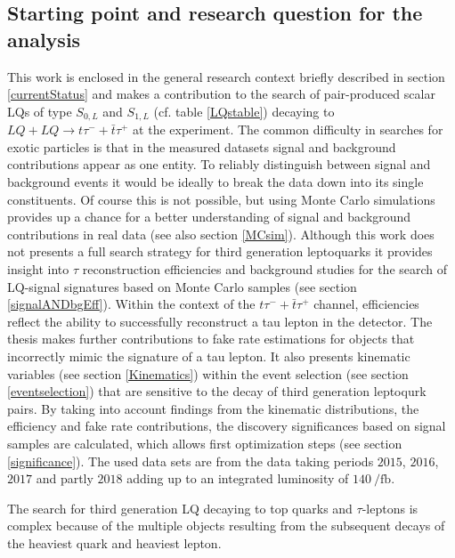 \subsection{Starting point and research question for the analysis}\label{startingpoint}
This work is enclosed in the general research context briefly described in section \ref{currentStatus} and makes a contribution to the search of pair-produced scalar LQs of type $S_{0,L}$ and $S_{1,L}$ (cf. table \ref{LQstable}) decaying to $LQ+LQ\rightarrow t\tau^{-}+\bar{t}\tau^{+}$ at the {\ATLAS} experiment. The common difficulty in searches for exotic particles is that in the measured datasets signal and background contributions appear as one entity. To reliably distinguish between signal and background events it would be ideally to break the data down into its single constituents. Of course this is not possible, but using Monte Carlo simulations provides up a chance for a better understanding of signal and background contributions in real data (see also section \ref{MCsim}). Although this work does not presents a full search strategy for third generation leptoquarks it provides insight into $\tau$ reconstruction efficiencies and background studies for the search of LQ-signal signatures based on Monte Carlo samples (see section \ref{signalANDbgEff}). Within the context of the $t\tau^{-}+\bar{t}\tau^{+}$ channel, efficiencies reflect the ability to successfully reconstruct a tau lepton in the detector. The thesis makes further contributions to fake rate estimations for objects that incorrectly mimic the signature of a tau lepton. It also presents kinematic variables (see section \ref{Kinematics}) within the event selection (see section \ref{eventselection}) that are sensitive to the decay of third generation leptoqurk pairs. By taking into account findings from the kinematic distributions, the efficiency and fake rate contributions, the discovery significances based on signal samples are calculated, which allows first optimization steps (see section \ref{significance}). The used data sets are from the data taking periods $2015$, $2016$, $2017$ and partly $2018$ adding up to an integrated luminosity of $\SI{140}{\per\femto\barn}$.\par   
The search for third generation LQ decaying to top quarks and $\tau$-leptons is complex because of the multiple objects resulting from the subsequent decays of the heaviest quark and heaviest lepton. 
%
%
